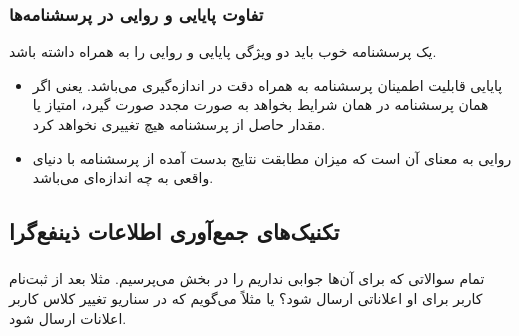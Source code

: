 \subsubsection*{تفاوت پایایی و روایی در پرسشنامه‌ها}

یک پرسشنامه خوب باید دو ویژگی پایایی و روایی را به همراه داشته باشد. 

\begin{itemize}
    \item پایایی قابلیت اطمینان پرسشنامه به همراه دقت در اندازه‌گیری می‌باشد.
    یعنی اگر همان پرسشنامه در همان شرایط بخواهد به صورت مجدد صورت گیرد، امتیاز
    یا مقدار حاصل از پرسشنامه هیچ تغییری نخواهد کرد.
    \item روایی به معنای آن است که میزان مطابقت نتایج بدست آمده از پرسشنامه با
    دنیای واقعی به چه اندازه‌ای می‌باشد.
\end{itemize}

\subsubsection{}

\subsubsection{}

\subsubsection{}

\subsubsection{}

\subsection{تکنیک‌های جمع‌آوری اطلاعات ذینفع‌گرا}

\subsubsection{}

تمام سوالاتی که برای آن‌ها جوابی نداریم را در بخش  می‌پرسیم. مثلا
بعد از ثبت‌نام کاربر برای او اعلاناتی ارسال شود؟ یا مثلاً می‌گویم که در سناریو
تغییر کلاس کاربر اعلانات ارسال شود.

\subsubsection{}

\subsubsection{}